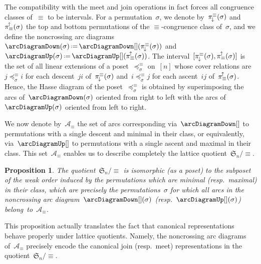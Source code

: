 \documentclass{amsart}
\newtheorem{proposition}[theorem]{Proposition}
\theoremstyle{definition}
\newcommand{\f}[1]{{\mathfrak{#1}}} %
\newcommand{\ssm}{\smallsetminus} %
\newcommand{\eqdef}{\mbox{\,\raisebox{0.2ex}{\scriptsize\ensuremath{\mathrm:}}\ensuremath{=}\,}} %
\newcommand{\arcs}{{\mathcal{A}}} %
\newcommand{\nonarcs}{{\mathcal{B}}} %
\newcommand{\projDown}{\smash{\pi^{\equiv}_{\!\downarrow\!}}} %
\newcommand{\projUp}{\smash{\pi_{\equiv}^{\!\uparrow\!}}} %
\begin{document}
The compatibility with the meet and join operations in fact forces all congruence classes of~$\equiv$ to be intervals.
For a permutation~$\sigma$, we denote by~$\projDown(\sigma)$ and~$\projUp(\sigma)$ the top and bottom permutations of the $\equiv$-congruence class of~$\sigma$, and we define the noncrossing arc diagrams~$\arcDiagramDown(\sigma) \eqdef \arcDiagramDown[](\projDown(\sigma))$ and~$\arcDiagramUp(\sigma) \eqdef \arcDiagramUp[](\projUp(\sigma))$.
The interval~$[\projDown(\sigma), \projUp(\sigma)]$ is the set of all linear extensions of a poset~$\preccurlyeq^\equiv_\sigma$ on~$[n]$ whose cover relations are~$j \preccurlyeq^\equiv_\sigma i$ for each descent~$ji$ of~$\projDown(\sigma)$ and~$i \preccurlyeq^\equiv_\sigma j$ for each ascent~$ij$ of~$\projUp(\sigma)$.
Hence, the Hasse diagram of the poset~$\preccurlyeq^\equiv_\sigma$ is obtained by superimposing the arcs of~$\arcDiagramDown(\sigma)$ oriented from right to left with the arcs of~$\arcDiagramUp(\sigma)$ oriented from left to right.

We now denote by~$\arcs_\equiv$ the set of arcs corresponding via~$\arcDiagramDown[]$ to permutations with a single descent and minimal in their class, or equivalently, via~$\arcDiagramUp[]$ to permutations with a single ascent and maximal in their class.
This set~$\arcs_\equiv$ enables us to describe completely the lattice quotient~$\f{S}_n / {\equiv}$.

\begin{proposition}
The quotient~$\f{S}_n/{\equiv}$ is isomorphic (as a poset) to the subposet of the weak order induced by the permutations which are minimal (resp.~maximal) in their class, which are precisely the permutations~$\sigma$ for which all arcs in the noncrossing arc diagram~$\arcDiagramDown[](\sigma)$ (resp.~$\arcDiagramUp[](\sigma)$) belong~to~$\arcs_\equiv$.
\end{proposition}

This proposition actually translates the fact that canonical representations behave properly under lattice quotients.
Namely, the noncrossing arc diagrams of~$\arcs_\equiv$ precisely encode the canonical join (resp.~meet) representations in the quotient~$\f{S}_n/{\equiv}$.
\end{document}
